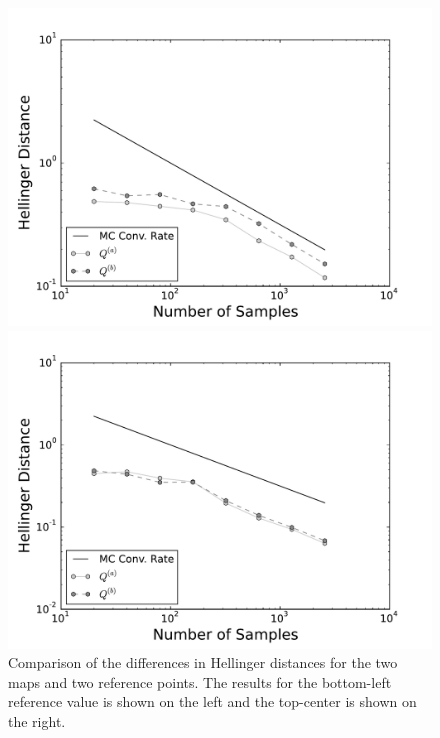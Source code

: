 \begin{figure}[h]
\begin{minipage}{.475\textwidth}
\includegraphics[width=\linewidth]{./images/pt0Plot-reg_BigN_40000_reg_M_1_rand_I_100000}
\end{minipage}
\begin{minipage}{.475\textwidth}
\includegraphics[width=\linewidth]{./images/pt5Plot-reg_BigN_40000_reg_M_1_rand_I_100000}
\end{minipage}
  \caption{Comparison of the differences in Hellinger distances for the two maps and two reference points. The results for the bottom-left reference value is shown on the left and the top-center is shown on the right.}
\label{fig:NLHD}
\end{figure}

